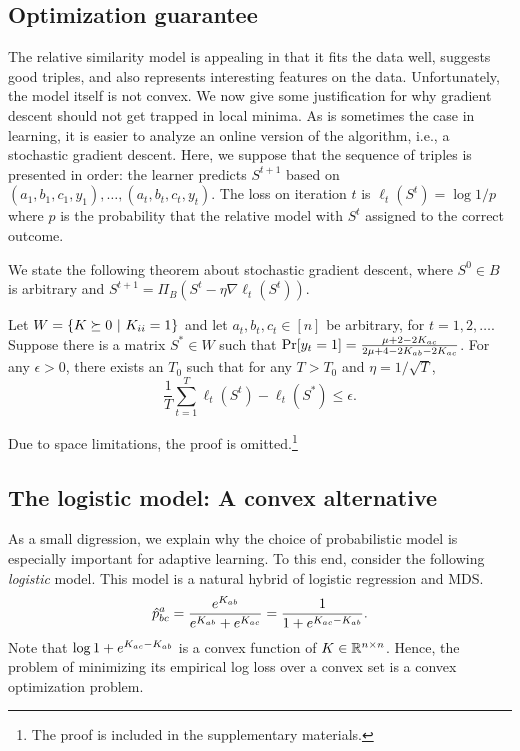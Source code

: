 \documentclass{article}
\begin{document}
\subsection{Optimization guarantee}\label{sec:theory}

The relative similarity model is appealing in that it fits the data well, suggests good triples, and also represents interesting features on the data.  Unfortunately, the model itself is not convex.  We now give some justification for why gradient descent should not get trapped in local minima.  As is sometimes the case in learning, it is easier to analyze an online version of the algorithm, i.e., a stochastic gradient descent.  Here, we suppose that the sequence of triples is presented in order: the learner predicts $S^{t+1}$ based on $(a_1,b_1,c_1,y_1),\ldots,(a_t,b_t,c_t,y_t)$.  The loss on iteration $t$ is $\ell_t(S^t)=\log 1/p$ where $p$ is the probability that the relative model with $S^t$ assigned to the correct outcome.

We state the following theorem about stochastic gradient descent, where $S^0 \in B$ is arbitrary and $S^{t+1}=\Pi_B(S^t-\eta \nabla\ell_t(S^t))$.
\begin{theorem}
Let $W = \{\S \succeq 0~|~\S_{ii}=1\}$ and let $a_t,b_t,c_t \in [n]$ be arbitrary, for $t=1,2,\ldots$.  Suppose there is a matrix $S^*\in W$ such that $\Pr[y_t=1]=\frac{\mu+2-2\S_{ac}}{2\mu+4-2\S_{ab}-2\S_{ac}}$.  For any $\epsilon>0$, there exists an $T_0$ such that for any $T>T_0$ and $\eta=1/\sqrt{T}$,
$$\frac{1}{T}\sum_{t=1}^T \ell_t(S^t)-\ell_t(S^*) \leq \epsilon.$$
\end{theorem}
Due to space limitations, the proof is omitted.\footnote{The proof is included in the supplementary materials.}


\subsection{The logistic model: A convex alternative}\label{sec:logistic}
As a small digression, we explain why the choice of probabilistic model is especially important for adaptive learning.  To this end, consider the following {\em logistic} model.  This model is a natural hybrid of logistic regression and MDS. 
\begin{equation}\label{eq:logistic}
\hat{p}^a_{bc} = \frac{e^{\S_{ab}}}{e^{\S_{ab}}+e^{\S_{ac}}} = \frac{1}{1+e^{\S_{ac}-\S_{ab}}}.
\end{equation}
Note that $\log 1+e^{\S_{ac}-\S_{ab}}$ is a convex function of $\S\in \reals^{n\times n}$.  Hence, the problem of minimizing its empirical log loss over a convex set is a convex optimization problem.  
\end{document}
